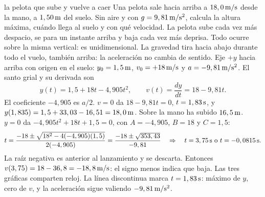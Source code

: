 \documentclass[11pt,a4paper]{article}
\begin{document}
\begin{examplebox}{la pelota que sube y vuelve a caer}
 Una pelota sale hacia arriba a $18,0\,\mathrm{m/s}$ desde la mano, a
$1,50\,\mathrm{m}$ del suelo. Sin aire y con $g=9,81\,\mathrm{m/s^2}$, calcula la altura m\'axima, cu\'ando
llega al suelo y con qu\'e velocidad.
\solutionblock
{} La pelota sube cada vez m\'as despacio, se para un instante arriba y
baja cada vez m\'as deprisa. Todo ocurre sobre la misma vertical: es unidimensional.
La gravedad tira hacia abajo durante todo el vuelo, tambi\'en arriba: la aceleraci\'on no
cambia de sentido.
 Eje $+y$ hacia arriba con origen en el suelo: $y_0=1,5\,\mathrm{m}$,
$v_0=+18\,\mathrm{m/s}$ y $a=-9,81\,\mathrm{m/s^2}$. El santo grial y su derivada son
\[
y(t)=1,5+18t-4,905t^2,\qquad v(t)=\frac{dy}{dt}=18-9,81t.
\]
El coeficiente $-4,905$ es $a/2$.
 $v=0$ da $18-9,81t=0$, $t=1,83\,\mathrm{s}$, y
$y(1,835)=1,5+33,03-16,51=18,0\,\mathrm{m}$. Sobre la mano ha subido $16,5\,\mathrm{m}$.
 $y=0$ da $-4,905t^2+18t+1,5=0$, con
$A=-4,905$, $B=18$ y $C=1,5$:
\[
t=\frac{-18\pm\sqrt{18^2-4(-4,905)(1,5)}}{2(-4,905)}=\frac{-18\pm\sqrt{353,43}}{-9,81}
\quad\Rightarrow\quad t=3,75\units{s}\ \text{o}\ t=-0,0815\units{s}.
\]
La ra\'iz negativa es anterior al lanzamiento y se descarta. Entonces
$v(3,75)=18-36,8=-18,8\,\mathrm{m/s}$: el signo menos indica que baja.
 Las tres gr\'aficas comparten reloj. La l\'inea discontinua marca
$t=1,83\,\mathrm{s}$: m\'aximo de $y$, cero de $v$, y la aceleraci\'on sigue valiendo $-9,81\,\mathrm{m/s^2}$.
\begin{center}
\end{center}
\end{examplebox}
\end{document}
